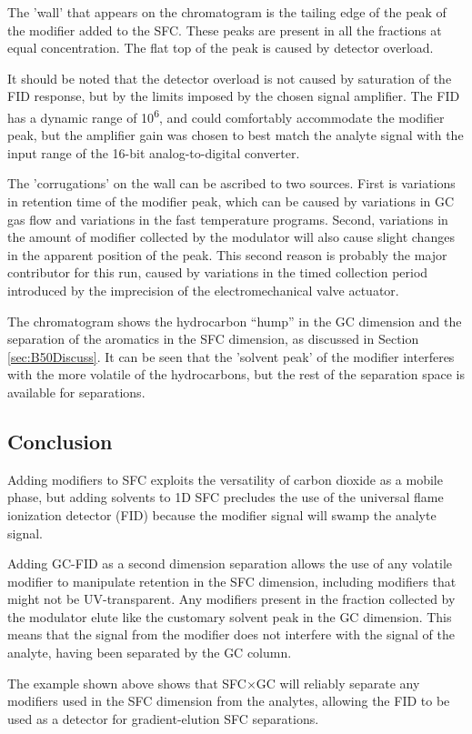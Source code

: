 The 'wall' that appears on the chromatogram is the tailing edge of the peak of
the modifier added to the SFC. These peaks are present in all the fractions at
equal concentration. The flat top of the peak is caused by detector overload. 

It should be noted that the detector overload is not caused by saturation of the
FID response, but by the limits imposed by the chosen signal amplifier. The FID
has a dynamic range of 10\textsuperscript{6}, and could comfortably accommodate
the modifier peak, but the amplifier gain was chosen to best match the analyte signal
with the input range of the 16-bit analog-to-digital converter.

The 'corrugations' on the wall can be ascribed to two sources. First is
variations in retention time of the modifier peak, which can be caused by
variations in GC gas flow and variations in the fast temperature programs.
Second, variations in the amount of modifier collected by the modulator will
also cause slight changes in the apparent position of the peak. This second
reason is probably the major contributor for this run, caused by variations in
the timed collection period introduced by the imprecision of the
electromechanical valve actuator.

The chromatogram shows the hydrocarbon ``hump'' in the GC dimension and the
separation of the aromatics in the SFC dimension, as discussed in Section
\ref{sec:B50Discuss}. It can be seen that the 'solvent peak' of the modifier
interferes with the more volatile of the hydrocarbons, but the rest of the
separation space is available for separations. 

\subsection{Conclusion}

Adding modifiers to SFC exploits the versatility of carbon dioxide as a mobile
phase, but adding solvents to 1D SFC precludes the use of the universal flame
ionization detector (FID) because the modifier signal will swamp the analyte
signal.

Adding GC-FID as a second dimension separation allows the use of any volatile
modifier to manipulate retention in the SFC dimension, including modifiers that
might not be UV-transparent. Any modifiers present in the fraction collected
by the modulator elute like the customary solvent peak in the GC dimension.
This means that the signal from the modifier does not interfere with the signal
of the analyte, having been separated by the GC column.

The example shown above shows that SFC×GC will reliably separate any modifiers
used in the SFC dimension from the analytes, allowing the FID to be used as a
detector for gradient-elution SFC separations.
